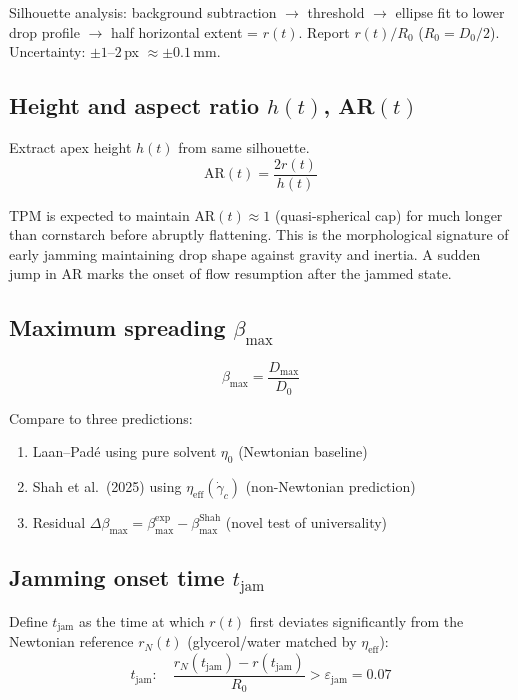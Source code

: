 \documentclass[11pt,letterpaper]{article}
\newcommand{\tjam}{t_{\mathrm{jam}}}
\newcommand{\etaeff}{\eta_{\mathrm{eff}}}
\newcommand{\gamcrit}{\dot{\gamma}_c}
\newcommand{\betamax}{\beta_{\max}}
\begin{document}
Silhouette analysis: background subtraction $\to$ threshold $\to$ ellipse fit to
lower drop profile $\to$ half horizontal extent = $r(t)$. Report $r(t)/R_0$
($R_0 = D_0/2$). Uncertainty: $\pm1$--$2$\,px $\approx \pm 0.1$\,mm.

\subsection{Height and aspect ratio $h(t)$, AR$(t)$}

Extract apex height $h(t)$ from same silhouette.
\begin{equation}
  \text{AR}(t) = \frac{2r(t)}{h(t)}
\end{equation}

\begin{intuitionbox}
TPM is expected to maintain $\text{AR}(t) \approx 1$ (quasi-spherical cap)
for much longer than cornstarch before abruptly flattening. This is the
morphological signature of early jamming maintaining drop shape against
gravity and inertia. A sudden jump in AR marks the onset of flow resumption
after the jammed state.
\end{intuitionbox}

\subsection{Maximum spreading $\betamax$}

\begin{equation}
  \betamax = \frac{D_\mathrm{max}}{D_0}
\end{equation}

Compare to three predictions:
\begin{enumerate}[noitemsep,topsep=3pt]
  \item Laan--Padé using pure solvent $\eta_0$ (Newtonian baseline) \cite{Laan2014}
  \item Shah et al.\ (2025) using $\etaeff(\gamcrit)$ (non-Newtonian prediction) \cite{Mobaseri2025}
  \item Residual $\Delta\betamax = \betamax^\mathrm{exp} - \betamax^\mathrm{Shah}$ (novel test of universality)
\end{enumerate}

\subsection{Jamming onset time $\tjam$}

Define $\tjam$ as the time at which $r(t)$ first deviates significantly from the
Newtonian reference $r_N(t)$ (glycerol/water matched by $\etaeff$):
\begin{equation}
  \tjam:\quad \frac{r_N(\tjam) - r(\tjam)}{R_0} > \varepsilon_\mathrm{jam} = 0.07
  \label{eq:t_jam}
\end{equation}
\end{document}
